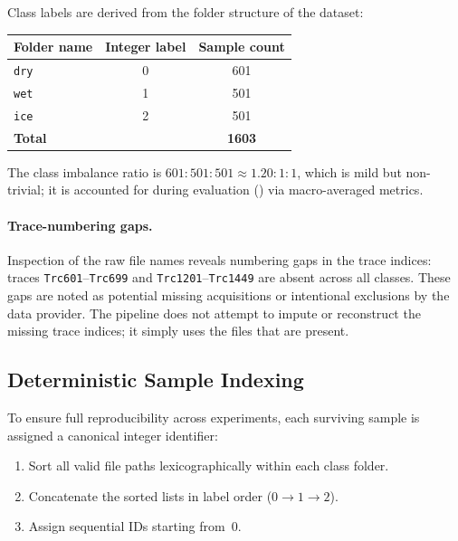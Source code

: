 Class labels are derived from the folder structure of the dataset:

\begin{center}
\begin{tabular}{lcc}
\toprule
\textbf{Folder name} & \textbf{Integer label} & \textbf{Sample count} \\
\midrule
\texttt{dry}  & 0 & 601 \\
\texttt{wet}  & 1 & 501 \\
\texttt{ice}  & 2 & 501 \\
\midrule
\multicolumn{2}{l}{\textbf{Total}} & \textbf{1603} \\
\bottomrule
\end{tabular}
\end{center}

The class imbalance ratio is $601:501:501 \approx 1.20:1:1$, which is
mild but non-trivial; it is accounted for during evaluation
() via macro-averaged metrics.

\paragraph{Trace-numbering gaps.}
Inspection of the raw file names reveals numbering gaps in the trace
indices: traces \texttt{Trc601}--\texttt{Trc699} and
\texttt{Trc1201}--\texttt{Trc1449} are absent across all classes.
These gaps are noted as potential missing acquisitions or intentional
exclusions by the data provider.  The pipeline does not attempt to
impute or reconstruct the missing trace indices; it simply uses the
files that are present.

\subsection{Deterministic Sample Indexing}
\label{sec:preproc:indexing}

To ensure full reproducibility across experiments, each surviving sample
is assigned a canonical integer identifier:

\begin{enumerate}
  \item Sort all valid file paths lexicographically within each class
        folder.
  \item Concatenate the sorted lists in label order
        ($0 \to 1 \to 2$).
  \item Assign sequential IDs starting from~$0$.
\end{enumerate}

